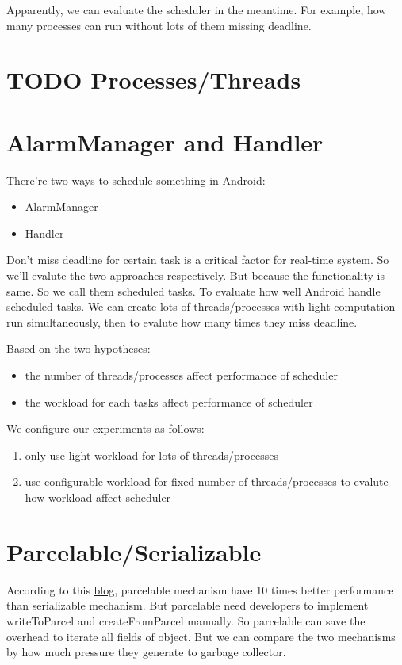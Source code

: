 \documentclass[11pt]{article}
\begin{document}
Apparently, we can evaluate the scheduler in the meantime.
For example, how many processes can run without lots of them missing deadline.

\section{{\bfseries\sffamily TODO} \label{Processes/Threads}Processes/Threads}
\label{sec-5}

\section{AlarmManager and Handler}
\label{sec-6}
There're two ways to schedule something in Android:

\begin{itemize}
\item AlarmManager
\item Handler
\end{itemize}

Don't miss deadline for certain task is a critical factor for real-time system.
So we'll evalute the two approaches respectively.
But because the functionality is same.
So we call them scheduled tasks.
To evaluate how well Android handle scheduled tasks.
We can create lots of threads/processes with light computation run simultaneously,
then to evalute how many times they miss deadline.

Based on the two hypotheses:
\begin{itemize}
\item the number of threads/processes affect performance of scheduler
\item the workload for each tasks affect performance of scheduler
\end{itemize}

We configure our experiments as follows:
\begin{enumerate}
\item only use light workload for lots of threads/processes
\item use configurable workload for fixed number of threads/processes to evalute how workload affect scheduler
\end{enumerate}

\section{\label{Parcelable/Serializable}Parcelable/Serializable}
\label{sec-7}
According to this \href{http://www.developerphil.com/parcelable-vs-serializable/}{blog}, parcelable mechanism have 10 times better performance than serializable mechanism.
But parcelable need developers to implement writeToParcel and createFromParcel manually.
So parcelable can save the overhead to iterate all fields of object.
But we can compare the two mechanisms by how much pressure they generate to garbage collector.
\end{document}
